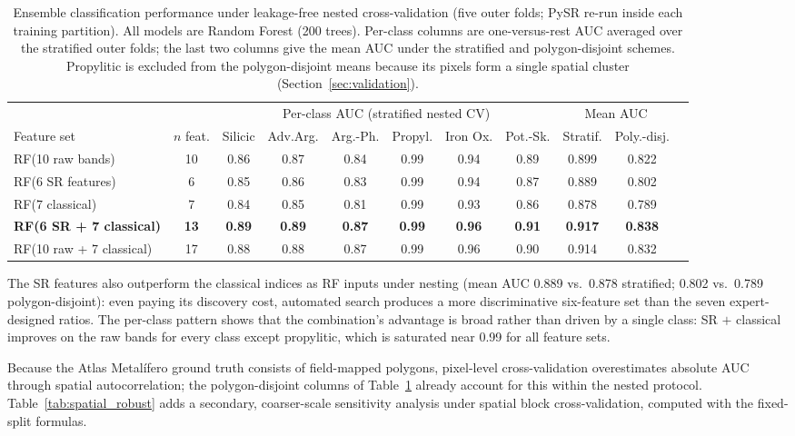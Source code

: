 \documentclass[preprint,authoryear,number]{elsarticle}
\begin{document}
\begin{table}[ht]
\centering
\caption{Ensemble classification performance under leakage-free nested cross-validation (five outer folds; PySR re-run inside each training partition). All models are Random Forest (200 trees). Per-class columns are one-versus-rest AUC averaged over the stratified outer folds; the last two columns give the mean AUC under the stratified and polygon-disjoint schemes. Propylitic is excluded from the polygon-disjoint means because its pixels form a single spatial cluster (Section~\ref{sec:validation}).}
\label{tab:ensemble}
\begin{tabular}{lcccccccccc}
\toprule
 & & \multicolumn{6}{c}{Per-class AUC (stratified nested CV)} & \multicolumn{2}{c}{Mean AUC} \\
\cmidrule(lr){3-8} \cmidrule(lr){9-10}
Feature set & $n$ feat. & Silicic & Adv.Arg. & Arg.-Ph. & Propyl. & Iron Ox. & Pot.-Sk. & Stratif. & Poly.-disj. \\
\midrule
RF(10 raw bands) & 10 & 0.86 & 0.87 & 0.84 & 0.99 & 0.94 & 0.89 & 0.899 & 0.822 \\
RF(6 SR features) & 6 & 0.85 & 0.86 & 0.83 & 0.99 & 0.94 & 0.87 & 0.889 & 0.802 \\
RF(7 classical) & 7 & 0.84 & 0.85 & 0.81 & 0.99 & 0.93 & 0.86 & 0.878 & 0.789 \\
\textbf{RF(6 SR + 7 classical)} & \textbf{13} & \textbf{0.89} & \textbf{0.89} & \textbf{0.87} & \textbf{0.99} & \textbf{0.96} & \textbf{0.91} & \textbf{0.917} & \textbf{0.838} \\
RF(10 raw + 7 classical) & 17 & 0.88 & 0.88 & 0.87 & 0.99 & 0.96 & 0.90 & 0.914 & 0.832 \\
\bottomrule
\end{tabular}
\end{table}

The SR features also outperform the classical indices as RF inputs under nesting (mean AUC 0.889 vs.\ 0.878 stratified; 0.802 vs.\ 0.789 polygon-disjoint): even paying its discovery cost, automated search produces a more discriminative six-feature set than the seven expert-designed ratios. The per-class pattern shows that the combination's advantage is broad rather than driven by a single class: SR $+$ classical improves on the raw bands for every class except propylitic, which is saturated near 0.99 for all feature sets.

Because the Atlas Metal\'ifero ground truth consists of field-mapped polygons, pixel-level cross-validation overestimates absolute AUC through spatial autocorrelation; the polygon-disjoint columns of Table~\ref{tab:ensemble} already account for this within the nested protocol. Table~\ref{tab:spatial_robust} adds a secondary, coarser-scale sensitivity analysis under spatial block cross-validation, computed with the fixed-split formulas.
\end{document}
